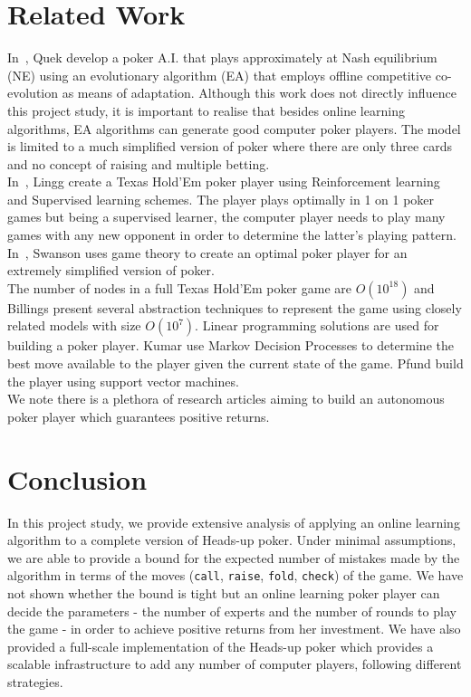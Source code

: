 \documentclass[12pt]{article}
\begin{document}
\section{Related Work}
\label{sec:related}
\noindent In~\cite{quek2009evolving}, Quek \etal develop a poker A.I. that plays approximately at Nash equilibrium (NE) using an
evolutionary algorithm (EA) that employs offline competitive co-evolution as means of adaptation. Although this work does not directly
influence this project study, it is important to realise that besides online learning algorithms, EA algorithms can generate
good computer poker players. The model is limited to a much simplified version of poker where there are only three cards
and no concept of raising and multiple betting.\\

\noindent In~\cite{stanford-report}, Lingg \etal create a Texas Hold'Em poker player using Reinforcement learning and Supervised learning schemes.
The player plays optimally in 1 on 1 poker games but being a supervised learner, the computer player needs to play many games with any
new opponent in order to determine the latter's playing pattern. In~\cite{swanson2005game}, Swanson \etal uses game theory to
create an optimal poker player for an extremely simplified version of poker.\\

\noindent The number of nodes in a full Texas Hold'Em poker game are $O(10^{18})$ and Billings \etal\cite{billings2003approximating} present
several abstraction techniques to represent the game using closely related models with size $O(10^7)$. Linear programming solutions are used for
building a poker player. Kumar \etal\cite{stanford-mdp} use Markov Decision Processes to determine the best move available to the player
given the current state of the game. Pfund \etal\cite{upenn-svm} build the player using support vector machines.\\

\noindent We note there is a plethora of research articles aiming to build an autonomous poker player which guarantees positive returns.

\section{Conclusion}
\label{sec:conclusion}
\noindent In this project study, we provide extensive analysis of applying an online learning algorithm to a complete version of Heads-up poker. Under
minimal assumptions, we are able to provide a bound for the expected number of mistakes made by the algorithm in terms of the moves (\texttt{call},
\texttt{raise}, \texttt{fold}, \texttt{check}) of the game. We have not shown whether the bound is tight but an online learning poker player
can decide the parameters - the number of experts and the number of rounds to play the game - in order to achieve positive returns from her investment.
We have also provided a full-scale implementation of the Heads-up poker which provides a scalable infrastructure to add any number of computer players,
following different strategies.
\end{document}
